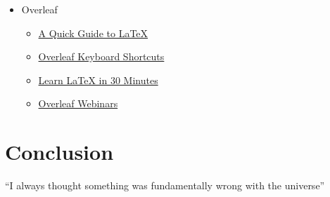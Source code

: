 \documentclass{article}
\begin{document}
\begin{itemize}
\item{Overleaf}

 \begin{itemize}  
    \item {\href{https://www.overleaf.com/latex/templates/a-quick-guide-to-latex-overleaf-version/bphpqrdgjyqy}{A Quick Guide to LaTeX}}
    \item {\href{https://www.overleaf.com/articles/overleaf-keyboard-shortcuts/qykqfvmxdnjf}{Overleaf Keyboard Shortcuts}}
    \item {\href{https://www.overleaf.com/learn/latex/Learn_LaTeX_in_30_minutes}{Learn LaTeX in 30 Minutes}}
    \item {\href{https://www.overleaf.com/events/webinars}{Overleaf Webinars}}
\end{itemize}
 \end{itemize}


\section{Conclusion}

``I always thought something was fundamentally wrong with the universe'' \cite[ p. 12]{adams}

\printbibliography
\end{document}
